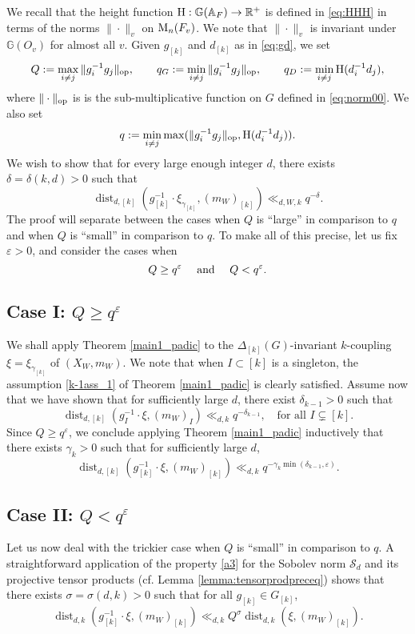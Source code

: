 \documentclass[11pt,reqno,a4paper]{amsart}
\numberwithin{equation}{section}
\newcommand{\cS}{\mathcal{S}}
\newcommand{\bA}{\mathbb{A}}
\newcommand{\bG}{\mathbb{G}}
\newcommand{\bR}{\mathbb{R}}
\newcommand{\eps}{\varepsilon}
\DeclareMathOperator{\dist}{dist}
\theoremstyle{theorem}
\theoremstyle{definition}
\begin{document}
We recall that the height function $\hbox{H}:\bG(\bA_F)\to\bR^+$ is defined in \eqref{eq:HHH}
in terms of the norms $\|\cdot \|_v$ on $\hbox{M}_n(F_v)$.
We note that $\|\cdot\|_v$ is
invariant under $\bG(O_v)$ for almost all $v$.
Given $g_{[k]}$ and $d_{[k]}$ as in \eqref{eq:gd}, we set
\begin{equation}
\label{defQqH}
Q := \max_{i \neq j} \|g_i^{-1} g_j\|_{\rm op}, \quad\quad q_G := \min_{i \neq j} \|g_i^{-1} g_j\|_{\rm op},\quad \quad q_D := \min_{i\ne j}\hbox{H}(d_i^{-1} d_j),
\end{equation}
where $\|\cdot\|_{\rm op}$ is is the sub-multiplicative function on $G$ defined in \eqref{eq:norm00}.
We also set
\begin{equation}
\label{defq2}
q := \min_{i \neq j} \max(\|g_i^{-1} g_j\|_{\rm op}, \hbox{H}(d_i^{-1} d_j)).
\end{equation}
We wish to show that for every large enough integer $d$, there 
exists $\delta=\delta(k,d) > 0$ such that 
\[
\dist_{d,[k]}(g_{[k]}^{-1} \cdot \xi_{\gamma_{[k]}},(m_W)_{[k]}) 
\ll_{d,W,k} q^{-\delta}.
\]
The proof
will separate between the cases when $Q$ is ``large'' in comparison to $q$ and when $Q$ is ``small''
in comparison to $q$.
To make all of this precise, let us fix $\eps > 0$,
and consider the cases when 
$$
Q\ge q^\eps\quad\hbox{ and }\quad Q<q^\eps.
$$

\subsection{Case I: $Q \geq q^{\eps}$}
We shall apply Theorem \ref{main1_padic} to the $\Delta_{[k]}(G)$-invariant $k$-coupling $\xi = \xi_{\gamma_{[k]}}$
of $(X_W,m_W)$. We note that when $I \subset [k]$ is a singleton, 
the assumption \eqref{k-1ass_1} of Theorem \ref{main1_padic}
is clearly satisfied.
Assume now that we have shown that for sufficiently large $d$, there exist $\delta_{k-1} > 0$ such that
\[
\dist_{d,[k]}(g_I^{-1} \cdot \xi, (m_W)_I) \ll_{d,k} q^{-\delta_{k-1}}, \quad \textrm{for all $I \subsetneq [k]$}.
\]
Since $Q \geq q^\eps$, we conclude applying Theorem \ref{main1_padic} inductively that there exists $\gamma_k > 0$ such that for sufficiently large $d$,
\begin{equation}
\label{step2}
\dist_{d,[k]}(g_{[k]}^{-1} \cdot \xi,(m_W)_{[k]}) \ll_{d,k} q^{-\gamma_k \min(\delta_{k-1},\eps)}.
\end{equation}

\subsection{Case II: $Q < q^\eps$}
Let us now deal with the trickier case when $Q$ is ``small'' in comparison to $q$. A straightforward application
of the property \eqref{a3} for the Sobolev norm $\cS_d$ and its projective tensor products
(cf. Lemma \ref{lemma:tensorprodpreceq}) shows that 
there exists $\sigma =\sigma(d,k)> 0$ such that for all $g_{[k]} \in G_{[k]}$,
\begin{equation}
\label{step1}
\dist_{d, k}(g_{[k]}^{-1} \cdot \xi,(m_W)_{[k]}) \ll_{d,k} Q^{\sigma} \dist_{d, k}(\xi,(m_W)_{[k]}).
\end{equation}
\end{document}
